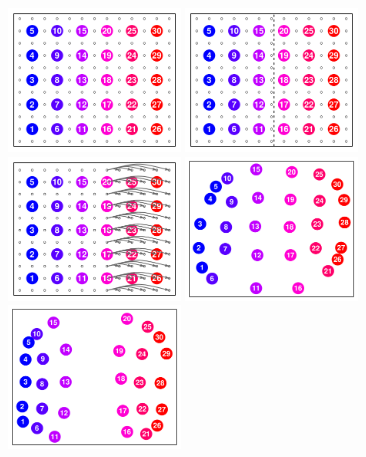 \documentclass[12pt]{article}
\begin{document}
\begin{figure}
	\centering
			{\includegraphics[width=1.8in,height=1.5in]{figs/sims/basic_lattice.pdf}}
			{\includegraphics[width=1.8in,height=1.5in]{figs/sims/barrier_lattice.pdf}}
			{\includegraphics[width=1.8in,height=1.5in]{figs/sims/expansion_lattice.pdf}}
			{\includegraphics[width=1.8in,height=1.5in]{figs/sims/GeoGenMap_lattice.pdf}}
			{\includegraphics[width=1.8in,height=1.5in]{figs/sims/GeoGenMap_barrier.pdf}}

\end{figure}
\end{document}
